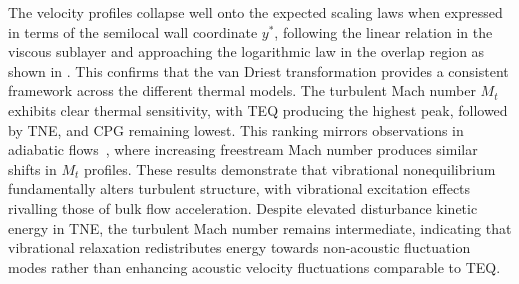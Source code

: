 The velocity profiles collapse well onto the expected scaling laws when expressed in terms of the semilocal wall coordinate $y^{*}$, following the linear relation in the viscous sublayer and approaching the logarithmic law in the overlap region as shown in . This confirms that the van Driest transformation provides a consistent framework across the different thermal models. The turbulent Mach number $M_t$ exhibits clear thermal sensitivity, with \gls{TEQ} producing the highest peak, followed by \gls{TNE}, and \gls{CPG} remaining lowest. This ranking mirrors observations in adiabatic flows~\citep{Duan2011}, where increasing freestream Mach number produces similar shifts in $M_t$ profiles. These results demonstrate that vibrational nonequilibrium fundamentally alters turbulent structure, with vibrational excitation effects rivalling those of bulk flow acceleration. Despite elevated disturbance kinetic energy in \gls{TNE}, the turbulent Mach number remains intermediate, indicating that vibrational relaxation redistributes energy towards non-acoustic fluctuation modes rather than enhancing acoustic velocity fluctuations comparable to \gls{TEQ}.





